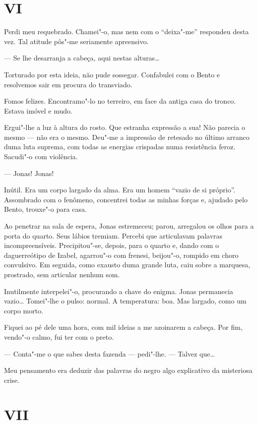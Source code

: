 \section*{VI}

Perdi meu requebrado. Chamei"-o, mas nem com o ``deixa"-me'' respondeu
desta vez. Tal atitude pôs"-me seriamente apreensivo.

--- Se lhe desarranja a cabeça, aqui nestas alturas\ldots{}

Torturado por esta ideia, não pude sossegar. Confabulei com o Bento e
resolvemos sair em procura do transviado.

Fomos felizes. Encontramo"-lo no terreiro, em face da antiga casa do
tronco. Estava imóvel e mudo.

Ergui"-lhe a luz à altura do rosto. Que estranha expressão a sua! Não
parecia o mesmo --- não era o mesmo. Deu"-me a impressão de retesado no
último arranco duma luta suprema, com todas as energias crispadas numa
resistência feroz. Sacudi"-o com violência.

--- Jonas! Jonas!

Inútil. Era um corpo largado da alma. Era um homem ``vazio de si
próprio''. Assombrado com o fenômeno, concentrei todas as minhas forças
e, ajudado pelo Bento, trouxe"-o para casa.

Ao penetrar na sala de espera, Jonas estremeceu; parou, arregalou os
olhos para a porta do quarto. Seus lábios tremiam. Percebi que
articulavam palavras incompreensíveis. Precipitou"-se, depois, para o
quarto e, dando com o daguerreótipo de Izabel, agarrou"-o com frenesi,
beijou"-o, rompido em choro convulsivo. Em seguida, como exausto duma
grande luta, caiu sobre a marquesa, prostrado, sem articular nenhum som.

Inutilmente interpelei"-o, procurando a chave do enigma. Jonas permanecia
vazio\ldots{} Tomei"-lhe o pulso: normal. A temperatura: boa. Mas largado,
como um corpo morto.

Fiquei ao pé dele uma hora, com mil ideias a me azoinarem a cabeça. Por
fim, vendo"-o calmo, fui ter com o preto.

--- Conta"-me o que sabes desta fazenda --- pedi"-lhe. --- Talvez que\ldots{}

Meu pensamento era deduzir das palavras do negro algo explicativo da
misteriosa crise.

\section*{VII}

